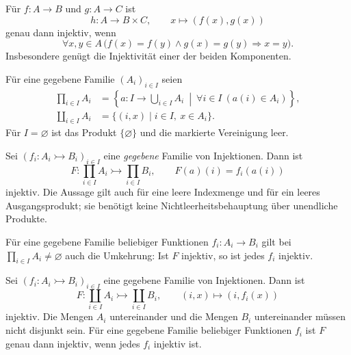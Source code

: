\begin{theorem}
\label{b06guide:thm:pairing}
Für $f\colon A\to B$ und $g\colon A\to C$ ist
\[
 h\colon A\to B\times C,\qquad x\mapsto(f(x),g(x))
\]
genau dann injektiv, wenn
\[
 \forall x,y\in A\,
 \bigl(f(x)=f(y)\land g(x)=g(y)\Rightarrow x=y\bigr).
\]
Insbesondere genügt die Injektivität einer der beiden Komponenten.
\end{theorem}

\begin{definition}
Für eine gegebene Familie $(A_i)_{i\in I}$ seien
\[
 \begin{aligned}
 \prod_{i\in I}A_i
   &=\left\{a\colon I\to\bigcup_{i\in I}A_i\
                 \middle|\ \forall i\in I\ (a(i)\in A_i)\right\},\\
 \coprod_{i\in I}A_i
   &=\{(i,x)\mid i\in I,\ x\in A_i\}.
 \end{aligned}
\]
Für $I=\varnothing$ ist das Produkt $\{\varnothing\}$
und die markierte Vereinigung leer.
\end{definition}

\begin{theorem}
\label{b06guide:thm:indexedproduct}
Sei $(f_i\colon A_i\rightarrowtail B_i)_{i\in I}$ eine
\emph{gegebene} Familie von Injektionen. Dann ist
\[
 F\colon\prod_{i\in I}A_i\rightarrowtail\prod_{i\in I}B_i,
 \qquad F(a)(i)=f_i(a(i))
\]
injektiv. Die Aussage gilt auch für eine leere Indexmenge
und für ein leeres Ausgangsprodukt; sie benötigt keine
Nichtleerheitsbehauptung über unendliche Produkte.

Für eine gegebene Familie beliebiger Funktionen
$f_i\colon A_i\to B_i$ gilt bei
$\prod_{i\in I}A_i\ne\varnothing$ auch die Umkehrung:
Ist $F$ injektiv, so ist jedes $f_i$ injektiv.
\end{theorem}

\begin{theorem}
\label{b06guide:thm:taggedunion}
Sei $(f_i\colon A_i\rightarrowtail B_i)_{i\in I}$ eine
gegebene Familie von Injektionen. Dann ist
\[
 F\colon\coprod_{i\in I}A_i\rightarrowtail\coprod_{i\in I}B_i,
 \qquad (i,x)\mapsto(i,f_i(x))
\]
injektiv. Die Mengen $A_i$ untereinander und die Mengen $B_i$
untereinander müssen nicht disjunkt sein.
Für eine gegebene Familie beliebiger Funktionen $f_i$
ist $F$ genau dann injektiv, wenn jedes $f_i$ injektiv ist.
\end{theorem}

